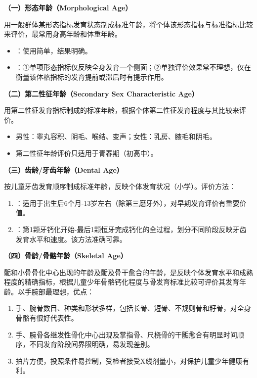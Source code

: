 \begin{keybox}
\textbf{（一）形态年龄（Morphological Age）}

用一般群体某形态指标发育状态制成标准年龄，将个体该形态指标与标准指标比较来评价，最常用身高年龄和体重年龄。

\begin{itemize}[leftmargin=*]
    \item {}：使用简单，结果明确。
    \item {}：①单项形态指标仅反映全身发育一个侧面；②单独评价效果常不理想，仅在衡量该体格指标的发育提前或滞后时有提示作用。
\end{itemize}

\textbf{（二）第二性征年龄（Secondary Sex Characteristic Age）}

用第二性征发育指标制成的标准年龄，根据个体第二性征发育程度与其比较来评价。

\begin{itemize}[leftmargin=*]
    \item 男性：睾丸容积、阴毛、喉结、变声；女性：乳房、腋毛和阴毛。
    \item 第二性征年龄评价只适用于青春期（初高中）。
\end{itemize}

\textbf{（三）齿龄/牙齿年龄（Dental Age）}

按儿童牙齿发育顺序制成标准年龄，反映个体发育状况（小学）。评价方法：

\begin{enumerate}[leftmargin=*]
    \item {}：适用于出生后6个月-13岁左右（除第三磨牙外），对早期发育评价有重要价值。
    \item {}：第1颗牙钙化开始-最后1颗恒牙完成钙化的全过程，划分不同阶段反映牙齿发育水平和速度。该方法准确可靠。
\end{enumerate}

\textbf{（四）骨龄/骨骼年龄（Skeletal Age）}

骺和小骨骨化中心出现的年龄及骺及骨干愈合的年龄，是反映个体发育水平和成熟程度的精确指标，根据儿童少年骨骼钙化程度与骨发育标准比较可评价其发育年龄。以手腕部最理想，优点：

\begin{enumerate}[leftmargin=*]
    \item 手、腕骨数目、种类和形状多样，包括长骨、短骨、不规则骨和籽骨，对全身骨骼有很好代表性。
    \item 手、腕骨各继发性骨化中心出现及掌指骨、尺桡骨的干骺愈合有明显时间顺序，不同发育阶段间界限明确，易发现差别。
    \item 拍片方便，投照条件易控制，受检者接受X线剂量小，对保护儿童少年健康有利。
\end{enumerate}
\end{keybox}

